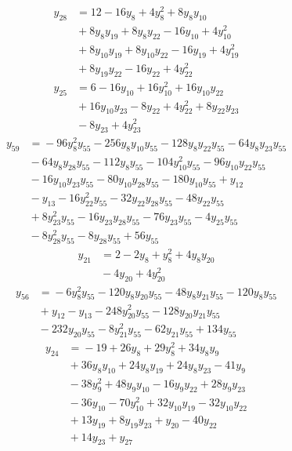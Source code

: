 \begin{align*}
y_{28} &={} 12 -16y_{8} +4y_{8}^{2} +8y_{8}y_{10} \\
 &{} +8y_{8}y_{19} +8y_{8}y_{22} -16y_{10} +4y_{10}^{2} \\
 &{} +8y_{10}y_{19} +8y_{10}y_{22} -16y_{19} +4y_{19}^{2} \\
 &{} +8y_{19}y_{22} -16y_{22} +4y_{22}^{2}
\end{align*}
\begin{align*}
y_{25} &={} 6 -16y_{10} +16y_{10}^{2} +16y_{10}y_{22} \\
 &{} +16y_{10}y_{23} -8y_{22} +4y_{22}^{2} +8y_{22}y_{23} \\
 &{} -8y_{23} +4y_{23}^{2}
\end{align*}
\begin{align*}
y_{59} &={} -96y_{8}^{2}y_{55} -256y_{8}y_{10}y_{55} -128y_{8}y_{22}y_{55} -64y_{8}y_{23}y_{55} \\
 &{} -64y_{8}y_{28}y_{55} -112y_{8}y_{55} -104y_{10}^{2}y_{55} -96y_{10}y_{22}y_{55} \\
 &{} -16y_{10}y_{23}y_{55} -80y_{10}y_{28}y_{55} -180y_{10}y_{55} +y_{12} \\
 &{} -y_{13} -16y_{22}^{2}y_{55} -32y_{22}y_{28}y_{55} -48y_{22}y_{55} \\
 &{} +8y_{23}^{2}y_{55} -16y_{23}y_{28}y_{55} -76y_{23}y_{55} -4y_{25}y_{55} \\
 &{} -8y_{28}^{2}y_{55} -8y_{28}y_{55} +56y_{55}
\end{align*}
\begin{align*}
y_{21} &={} 2 -2y_{8} +y_{8}^{2} +4y_{8}y_{20} \\
 &{} -4y_{20} +4y_{20}^{2}
\end{align*}
\begin{align*}
y_{56} &={} -6y_{8}^{2}y_{55} -120y_{8}y_{20}y_{55} -48y_{8}y_{21}y_{55} -120y_{8}y_{55} \\
 &{} +y_{12} -y_{13} -248y_{20}^{2}y_{55} -128y_{20}y_{21}y_{55} \\
 &{} -232y_{20}y_{55} -8y_{21}^{2}y_{55} -62y_{21}y_{55} +134y_{55}
\end{align*}
\begin{align*}
y_{24} &={} -19 +26y_{8} +29y_{8}^{2} +34y_{8}y_{9} \\
 &{} +36y_{8}y_{10} +24y_{8}y_{19} +24y_{8}y_{23} -41y_{9} \\
 &{} -38y_{9}^{2} +48y_{9}y_{10} -16y_{9}y_{22} +28y_{9}y_{23} \\
 &{} -36y_{10} -70y_{10}^{2} +32y_{10}y_{19} -32y_{10}y_{22} \\
 &{} +13y_{19} +8y_{19}y_{23} +y_{20} -40y_{22} \\
 &{} +14y_{23} +y_{27}
\end{align*}
